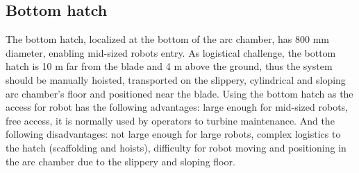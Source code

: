 \subsection{Bottom hatch}
The bottom hatch, localized at the bottom of the arc chamber, has 800 mm
diameter, enabling mid-sized robots entry. As logistical challenge, the bottom
hatch is 10 m far from the blade and 4 m above the ground, thus the
system should be manually hoisted, transported on the slippery, cylindrical and
sloping arc chamber's floor and positioned near the blade. Using the bottom
hatch as the access for robot has the following advantages: large enough for
mid-sized robots, free access, it is normally used by operators to turbine
maintenance. And the following disadvantages: not large enough for large robots,
complex logistics to the hatch (scaffolding and hoists), difficulty for robot
moving and positioning in the arc chamber due to the slippery and sloping floor.





